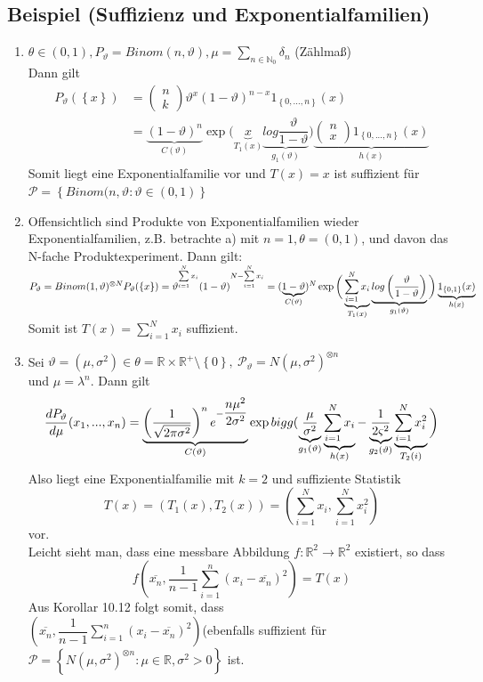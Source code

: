 \documentclass[german,10pt,oneside, fleqn, a4paper]{article}
\newcommand {\R}	{\mathbb{R}}
\newcommand {\N}	{\mathbb{N}}
\newcommand{\ra}{\rightarrow}
\newcommand{\sm}[2][\infty]{\sum\limits_{#2}^{#1}}
\newcommand{\brc}[1]{\left(#1\right)}
\newcommand{\brac}[1]{\left\lbrace #1\right\rbrace}
\newcommand{\mat}[1]{\begin{pmatrix}#1\end{pmatrix}}
\newcommand{\mc}[1]{\mathcal{#1}}
\newcommand{\1}[1]{1_{#1}}
\newcommand{\2}[1]{\1{\brac{#1}}}
\newcommand{\p}{\mc{P}}
\newcommand{\stuff}{{\otimes n}}
\begin{document}
\subsection{Beispiel (Suffizienz und Exponentialfamilien)}
\label{10.15}
\begin{enumerate}[label=(\alph*)]
\item $\theta\in(0,1), P_\vartheta=Binom(n,\vartheta), \mu=\sm[]{n\in\N_0}\delta_n$ (Zählmaß)\\
Dann gilt
\begin{align}
P_\vartheta(\brac{x}) & = \mat{n\\k}\vartheta^x(1-\vartheta)^{n-x}1_{\brac{0,...,n}}(x)\\
& = \underbrace{(1-\vartheta) ^n}_{C(\vartheta)}\exp\bigg(\underbrace{x}_{T_1(x)}\underbrace{log\dfrac{\vartheta}{1-\vartheta}}_{g_1(\vartheta)}\bigg)\underbrace{\mat{n\\x}1_{\brac{0,...,n}}(x)}_{h(x)}
\end{align}
Somit liegt eine Exponentialfamilie vor und $T(x)=x$ ist suffizient für $\p=\brac{Binom(n,\vartheta:\vartheta\in(0,1)}$
\item Offensichtlich sind Produkte von Exponentialfamilien wieder\\ Exponentialfamilien, z.B. betrachte a) mit $n=1, \theta=(0,1)$, und davon das N-fache Produktexperiment. Dann gilt: $P_\vartheta=Binom(1,\vartheta)^{\otimes N}\\
P_\vartheta(\brac{x})=\vartheta^{\sm[N]{i=1}x_i}(1-\vartheta)^{N-\sm[N]{i=1}x_i}\\
=(\underbrace{1-\vartheta}_{C(\vartheta)})^N\exp\bigg(\underbrace{\sm[N]{i=1}x_i}_{T_1(x)}\underbrace{log\brc{\dfrac{\vartheta}{1-\vartheta}}}_{g_1(\vartheta)}\bigg)\underbrace{1_{\brac{0,1}}(x)}_{h(x)}$\\
Somit ist $T(x)=\sm[N]{i=1}x_i$ suffizient.
\item Sei $\vartheta=(\mu,\sigma^2)\in\theta=\R\times\R^+\setminus\brac{0},\ \p_\vartheta=N(\mu,\sigma^2)^\stuff$\\
und $\mu=\lambda^n$. Dann gilt \[
\dfrac{dP_\vartheta}{d\mu}(x_1,...,x_n)=\underbrace{\brc{\dfrac{1}{\sqrt{2\pi\sigma^2}}}^ne^{-\dfrac{n\mu^2}{2\sigma^2}}}_{C(\vartheta)}\exp\\bigg(\underbrace{\dfrac{\mu}{\sigma^2}}_{g_1(\vartheta)}\underbrace{\sm[N]{i=1}x_i}_{h(x)}-\underbrace{\dfrac{1}{2\varsigma^2}}_{g_2(\vartheta)}\underbrace{\sm[N]{i=1}x_i^2}_{T_2(i)}\bigg)
\]
Also liegt eine Exponentialfamilie mit $k=2$ und suffiziente Statistik\[
T(x)=(T_1(x),T_2(x))=\brc{\sm[N]{i=1}x_i,\sm[N]{i=1}x_i^2}\]
vor.
 \\
Leicht sieht man, dass eine messbare Abbildung $f:\R^2\ra\R^2$ existiert, so dass 
\[f\brc{\overline{x_n},\dfrac{1}{n-1}\sm[n]{i=1}(x_i-\overline{x_n})^2}=T(x)\] 
Aus Korollar 10.12 folgt somit, dass \\
$\brc{\overline{x_n},\dfrac{1}{n-1}\sm[n]{i=1}(x_i-\overline{x_n})^2}$(ebenfalls  suffizient für $\mc{P}=\brac{N(\mu,\sigma^2)^\stuff:\mu\in\R,\sigma^2>0}$ ist.
\end{enumerate}
\end{document}
